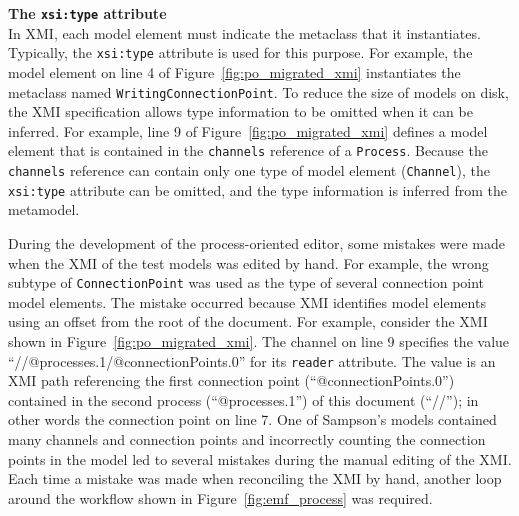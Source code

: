 \begin{framed}
\textbf{The \texttt{xsi:type} attribute} \\
In XMI, each model element must indicate the metaclass that it instantiates. Typically, the \texttt{xsi:type} attribute is used for this purpose. For example, the model element on line 4 of Figure~\ref{fig:po_migrated_xmi} instantiates the metaclass named \texttt{Wr\-i\-ti\-ngCo\-nn\-ec\-ti\-o\-nPo\-i\-nt}. To reduce the size of models on disk, the XMI specification allows type information to be omitted when it can be inferred. For example, line 9 of Figure~\ref{fig:po_migrated_xmi} defines a model element that is contained in the \texttt{ch\-an\-ne\-ls} reference of a \texttt{Pr\-o\-ce\-ss}. Because the \texttt{ch\-an\-ne\-ls} reference can contain only one type of model element (\texttt{Ch\-an\-n\-el}), the \texttt{xsi:type} attribute can be omitted, and the type information is inferred from the metamodel.
\end{framed}



During the development of the process-oriented editor, some mistakes were made when the XMI of the test models was edited by hand. For example, the wrong subtype of \texttt{Co\-nn\-ec\-ti\-onPo\-in\-t} was used as the type of several connection point model elements. The mistake occurred because XMI identifies model elements using an offset from the root of the document. For example, consider the XMI shown in Figure~\ref{fig:po_migrated_xmi}. The channel on line 9 specifies the value ``//@processes.1/@connectionPoints.0'' for its \texttt{re\-ad\-er} attribute. The value is an XMI path referencing the first connection point (``@connectionPoints.0'') contained in the second process (``@processes.1'') of this document (``//''); in other words the connection point on line 7. One of Sampson's models contained many channels and connection points and incorrectly counting the connection points in the model led to several mistakes during the manual editing of the XMI. Each time a mistake was made when reconciling the XMI by hand, another loop around the workflow shown in Figure~\ref{fig:emf_process} was required.

